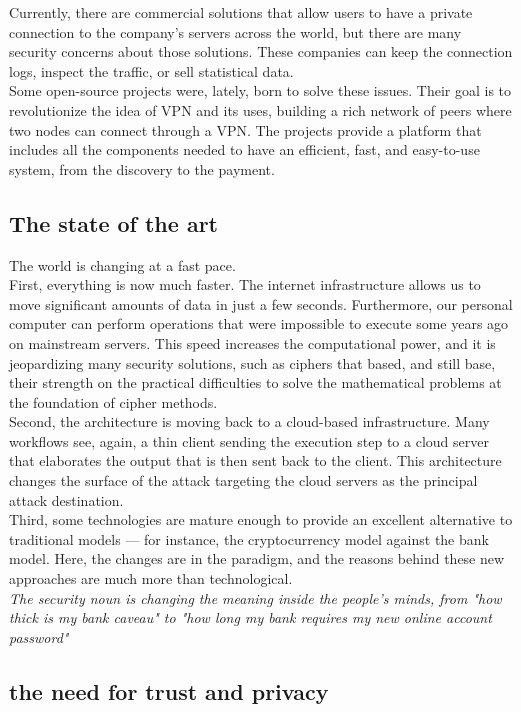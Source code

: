 \documentclass[12pt]{article}
\begin{document}
	Currently, there are commercial solutions that allow users to have a private connection to the company's servers across the world, but there are many security concerns about those solutions. These companies can keep the connection logs, inspect the traffic, or sell statistical data.\\
    Some open-source projects were, lately, born to solve these issues. Their goal is to revolutionize the idea of VPN and its uses, building a rich network of peers where two nodes can connect through a VPN. The projects provide a platform that includes all the components needed to have an efficient, fast, and easy-to-use system, from the discovery to the payment.\\
	
	\subsection{The state of the art}
	The world is changing at a fast pace.\\
	First, everything is now much faster. The internet infrastructure allows us to move significant amounts of data in just a few seconds. Furthermore, our personal computer can perform operations that were impossible to execute some years ago on mainstream servers. This speed increases the computational power, and it is jeopardizing many security solutions, such as ciphers that based, and still base, their strength on the practical difficulties to solve the mathematical problems at the foundation of cipher methods.\\
	Second, the architecture is moving back to a cloud-based infrastructure. Many workflows see, again, a thin client sending the execution step to a cloud server that elaborates the output that is then sent back to the client. This architecture changes the surface of the attack targeting the cloud servers as the principal attack destination.\\
	Third, some technologies are mature enough to provide an excellent alternative to traditional models — for instance, the cryptocurrency model against the bank model. Here, the changes are in the paradigm, and the reasons behind these new approaches are much more than technological.\\

	\textit{The security noun is changing the meaning inside the people's minds, from "how thick is my bank caveau" to "how long my bank requires my new online account password"}

	\subsection{the need for trust and privacy}
\end{document}
